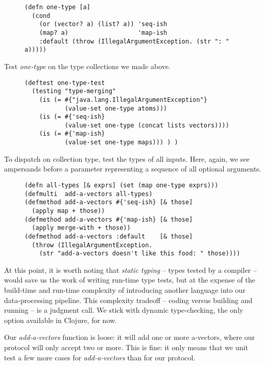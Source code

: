 \documentclass[11pt]{article}
\begin{document}
\begin{figure}[H]
\label{one-type}
\begin{verbatim}
(defn one-type [a]
  (cond
    (or (vector? a) (list? a)) 'seq-ish
    (map? a)                   'map-ish
    :default (throw (IllegalArgumentException. (str ": " a)))))
\end{verbatim}
\end{figure}

Test \emph{one-type} on the type collections we made above.

\begin{figure}[H]
\label{one-type-test}
\begin{verbatim}
(deftest one-type-test
  (testing "type-merging"
    (is (= #{"java.lang.IllegalArgumentException"}
           (value-set one-type atoms)))
    (is (= #{'seq-ish}
           (value-set one-type (concat lists vectors))))
    (is (= #{'map-ish}
           (value-set one-type maps))) ) )
\end{verbatim}
\end{figure}

To dispatch on collection type, test the types of all inputs. Here,
again, we see ampersands before a parameter representing a sequence
of all optional arguments.

\begin{figure}[H]
\label{add-a-vectors}
\begin{verbatim}
(defn all-types [& exprs] (set (map one-type exprs)))
(defmulti  add-a-vectors all-types)
(defmethod add-a-vectors #{'seq-ish} [& those]
  (apply map + those))
(defmethod add-a-vectors #{'map-ish} [& those]
  (apply merge-with + those))
(defmethod add-a-vectors :default    [& those]
  (throw (IllegalArgumentException.
    (str "add-a-vectors doesn't like this food: " those))))
\end{verbatim}
\end{figure}

At this point, it is worth noting that \emph{static typing} -- types
tested by a compiler -- would save us the work of writing run-time
type tests, but at the expense of the build-time and run-time
complexity of introducing another language into our data-processing
pipeline. This complexity tradeoff -- coding versus building and
running -- is a judgment call.  We stick with dynamic type-checking,
the only option available in Clojure, for now.

Our \emph{add-a-vectors} function is loose: it will add one or more
a-vectors, where our protocol will only accept two or more. This is
fine: it only means that we unit test a few more cases for
\emph{add-a-vectors} than for our protocol.
\end{document}

